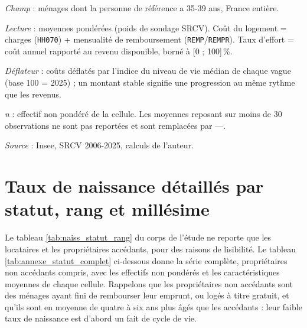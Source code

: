 \documentclass[12pt,a4paper]{article}
\begin{document}
\begin{table}[htbp]
\begin{threeparttable}
\begin{tabular}{lrrrrrrrrrr}
			\bottomrule
		\end{tabular}
		\begin{tablenotes}[flushleft]\scriptsize
			\item \textit{Champ} : ménages dont la personne de référence a 35-39 ans, France entière.
			\item \textit{Lecture} : moyennes pondérées (poids de sondage SRCV). Coût du logement =
			charges (\texttt{HH070}) + mensualité de remboursement (\texttt{REMP}/\texttt{REMPR}).
			Taux d'effort = coût annuel rapporté au revenu disponible, borné à [0 ; 100]\,\%.
			\item \textit{Déflateur} : coûts déflatés par l'indice du niveau de vie médian de chaque vague (base 100 = 2025) ; un montant stable signifie une progression au même rythme que les revenus.
			\item \textit{n} : effectif non pondéré de la cellule. Les moyennes reposant sur
			moins de 30 observations ne sont pas reportées et sont remplacées par ---.
			\item \textit{Source} : Insee, SRCV 2006-2025, calculs de l'auteur.
		\end{tablenotes}
	\end{threeparttable}
\end{table}

	\newpage

	\section{Taux de naissance détaillés par statut, rang et millésime}\label{annexe2}

	Le tableau \ref{tab:naiss_statut_rang} du corps de l'étude ne reporte que les locataires et les propriétaires accédants, pour des raisons de lisibilité. Le tableau \ref{tab:annexe_statut_complet} ci-dessous donne la série complète, propriétaires non accédants compris, avec les effectifs non pondérés et les caractéristiques moyennes de chaque cellule. Rappelons que les propriétaires non accédants sont des ménages ayant fini de rembourser leur emprunt, ou logés à titre gratuit, et qu'ils sont en moyenne de quatre à six ans plus âgés que les accédants : leur faible taux de naissance est d'abord un fait de cycle de vie.
\end{document}

